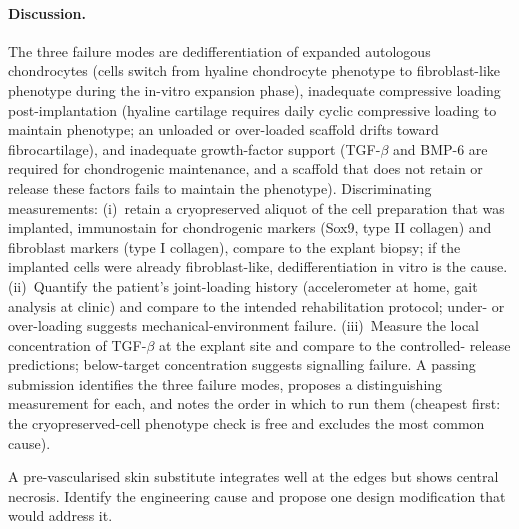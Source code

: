 \paragraph{Discussion.} The three failure modes are dedifferentiation
of expanded autologous chondrocytes (cells switch from hyaline
chondrocyte phenotype to fibroblast-like phenotype during the in-vitro
expansion phase), inadequate compressive loading post-implantation
(hyaline cartilage requires daily cyclic compressive loading to
maintain phenotype; an unloaded or over-loaded scaffold drifts toward
fibrocartilage), and inadequate growth-factor support (TGF-$\beta$
and BMP-6 are required for chondrogenic maintenance, and a scaffold
that does not retain or release these factors fails to maintain the
phenotype). Discriminating measurements: (i)~retain a cryopreserved
aliquot of the cell preparation that was implanted, immunostain for
chondrogenic markers (Sox9, type II collagen) and fibroblast markers
(type I collagen), compare to the explant biopsy; if the implanted
cells were already fibroblast-like, dedifferentiation in vitro is
the cause. (ii)~Quantify the patient's joint-loading history
(accelerometer at home, gait analysis at clinic) and compare to the
intended rehabilitation protocol; under- or over-loading suggests
mechanical-environment failure. (iii)~Measure the local concentration
of TGF-$\beta$ at the explant site and compare to the controlled-
release predictions; below-target concentration suggests signalling
failure. A passing submission identifies the three failure modes,
proposes a distinguishing measurement for each, and notes the order
in which to run them (cheapest first: the cryopreserved-cell
phenotype check is free and excludes the most common cause).

\begin{exercise}
A pre-vascularised skin substitute integrates well at the edges but
shows central necrosis. Identify the engineering cause and propose
one design modification that would address it.
\end{exercise}

